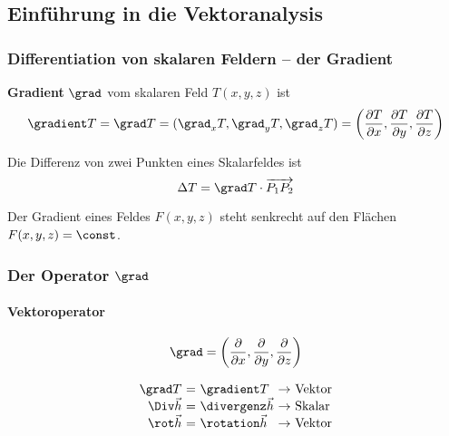 	
	\subsection{Einführung in die Vektoranalysis} %
		
		\subsubsection{Differentiation von skalaren Feldern -- der Gradient} %
			
			\begin{definition}
				\textbf{Gradient} $\grad$ vom skalaren Feld $T(x,y,z)$ ist
				\[
					\gradient T = \grad T = (\grad_x T, \grad_y T, \grad_z T) = \left( \frac{\partial T}{\partial x}, \frac{\partial T}{\partial y}, \frac{\partial T}{\partial z} \right)
				\]
			\end{definition}
			
			Die Differenz von zwei Punkten eines Skalarfeldes ist
			\[
				\Delta T = \grad T \cdot \overrightarrow{P_1 P_2}
			\]
			
			\begin{satz}
				Der Gradient eines Feldes $F(x,y,z)$ steht senkrecht auf den Flächen $F(x,y,z) = \const$.
			\end{satz}
			
		
		\subsubsection{Der Operator $\grad$} %
			
			\paragraph{Vektoroperator} %
				\[
					\grad = \left( \frac{\partial}{\partial x}, \frac{\partial}{\partial y}, \frac{\partial}{\partial z} \right)
				\]
			
			\[
				\begin{array}{r@{\ =\ }l@{\ \rightarrow \ }l}
					\grad T & \gradient T & \text{Vektor} \\
					\Div \vec{h} & \divergenz \vec{h} & \text{Skalar} \\
					\rot \vec{h} & \rotation \vec{h} & \text{Vektor}
				\end{array}
			\]
			

